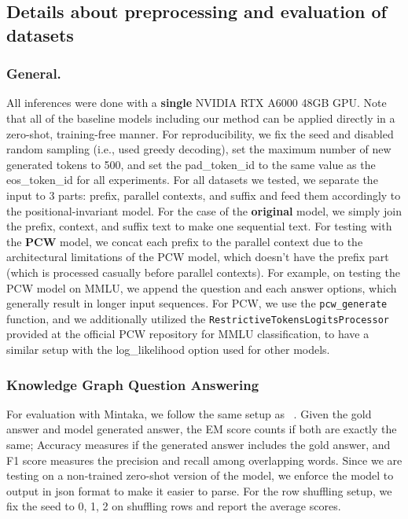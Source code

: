 \subsection{Details about preprocessing and evaluation of datasets}
\label{appendix:dataset_details}
\subsubsection{General.}
\label{appendix:dataset_details_general}
All inferences were done with a \textbf{single} NVIDIA RTX A6000 48GB GPU. Note that all of the baseline models including our method can be applied directly in a zero-shot, training-free manner. For reproducibility, we fix the seed and disabled random sampling (i.e., used greedy decoding), set the maximum number of new generated tokens to 500, and set the pad\_token\_id to the same value as the eos\_token\_id for all experiments.
For all datasets we tested, we separate the input to 3 parts: prefix, parallel contexts, and suffix and feed them accordingly to the positional-invariant model. For the case of the \textbf{original} model, we simply join the prefix, context, and suffix text to make one sequential text. For testing with the \textbf{PCW} model, we concat each prefix to the parallel context due to the architectural limitations of the PCW model, which doesn't have the prefix part (which is processed casually before parallel contexts). For example, on testing the PCW model on MMLU, we append the question and each answer options, which generally result in longer input sequences. For PCW, we use the \texttt{pcw\_generate} function, and we additionally utilized the \texttt{RestrictiveTokensLogitsProcessor} provided at the official PCW repository for MMLU classification, to have a similar setup with the log\_likelihood option used for other models.

\subsubsection{Knowledge Graph Question Answering}
\label{appendix:dataset_details_kgqa}
For evaluation with Mintaka, %
we follow the same setup as ~\citet{baek2023knowledgeaugmentedlanguagemodelverification}. Given the gold answer and model generated answer, the EM score counts if both are exactly the same; Accuracy measures if the generated answer includes the gold answer, and F1 score measures the precision and recall among overlapping words.
Since we are testing on a non-trained zero-shot version of the model, we enforce the model to output in json format to make it easier to parse. 
For the row shuffling setup, we fix the seed to 0, 1, 2 on shuffling rows and report the average scores.

